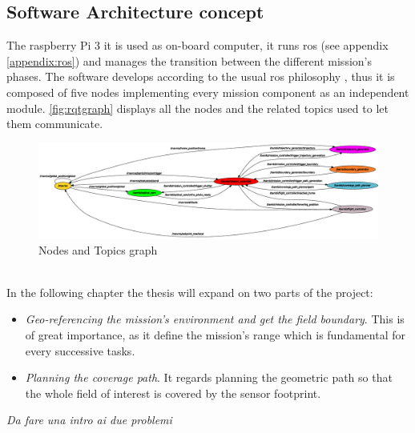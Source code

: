 \subsection{Software Architecture concept} %
 \label{sub:software_design}
 The raspberry Pi 3 it is used as on-board computer, it runs \acrshort{ros} (see appendix \ref{appendix:ros}) and manages the transition between the different mission's phases. The software develops according to the usual \acrshort{ros} philosophy \cite{288}, thus it is composed of five nodes implementing every mission component as an independent module. \autoref{fig:rqtgraph} displays all the nodes and the related topics used to let them communicate.
\begin{figure}[ht]
    \centering
    \includegraphics[width=1.4\textwidth, angle=270]{figures/C1/rqtgraph.eps}
    \caption{Nodes and Topics graph}
    \label{fig:rqtgraph}
\end{figure}\\
 In the following chapter the thesis will expand on two parts of the project:
 \begin{itemize}
  	\item \textit{Geo-referencing the mission's environment and get the field boundary}. This is of great importance, as it define the mission's range which is fundamental for every successive tasks.
  	\item \textit{Planning the coverage path}. It regards planning the geometric path so that the whole field of interest is covered by the sensor footprint.
  \end{itemize}

\textit{Da fare una intro ai due problemi}

 




